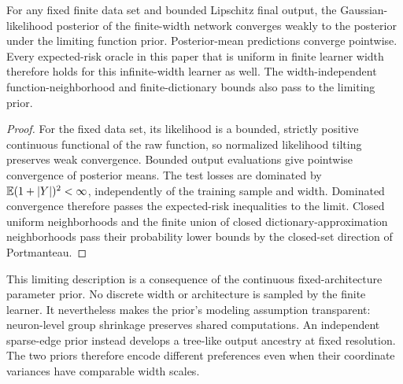\begin{corollary}
For any fixed finite data set and bounded Lipschitz final output, the Gaussian-likelihood posterior of the finite-width network converges weakly to the posterior under the limiting function prior. Posterior-mean predictions converge pointwise. Every expected-risk oracle in this paper that is uniform in finite learner width therefore holds for this infinite-width learner as well. The width-independent function-neighborhood and finite-dictionary bounds also pass to the limiting prior.
\end{corollary}
\begin{proof}
For the fixed data set, its likelihood is a bounded, strictly positive continuous functional of the raw function, so normalized likelihood tilting preserves weak convergence. Bounded output evaluations give pointwise convergence of posterior means. The test losses are dominated by $\mathbb E(1+|Y|)^2<\infty$, independently of the training sample and width. Dominated convergence therefore passes the expected-risk inequalities to the limit. Closed uniform neighborhoods and the finite union of closed dictionary-approximation neighborhoods pass their probability lower bounds by the closed-set direction of Portmanteau.
\end{proof}

This limiting description is a consequence of the continuous fixed-architecture parameter prior. No discrete width or architecture is sampled by the finite learner. It nevertheless makes the prior's modeling assumption transparent: neuron-level group shrinkage preserves shared computations. An independent sparse-edge prior instead develops a tree-like output ancestry at fixed resolution. The two priors therefore encode different preferences even when their coordinate variances have comparable width scales.
